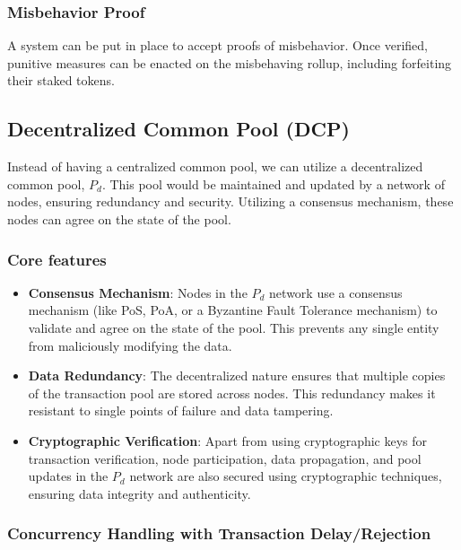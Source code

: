 \documentclass{article}
\begin{document}
\subsubsection{Misbehavior Proof}
A system can be put in place to accept proofs of misbehavior. Once verified, punitive measures can be enacted on the misbehaving rollup, including forfeiting their staked tokens.

\subsection{Decentralized Common Pool (DCP)}

Instead of having a centralized common pool, we can utilize a decentralized common pool, \( P_d \). This pool would be maintained and updated by a network of nodes, ensuring redundancy and security. Utilizing a consensus mechanism, these nodes can agree on the state of the pool.

\subsubsection{Core features}

\begin{itemize}
    \item \textbf{Consensus Mechanism}: Nodes in the \( P_d \) network use a consensus mechanism (like PoS, PoA, or a Byzantine Fault Tolerance mechanism) to validate and agree on the state of the pool. This prevents any single entity from maliciously modifying the data.
    
    \item \textbf{Data Redundancy}: The decentralized nature ensures that multiple copies of the transaction pool are stored across nodes. This redundancy makes it resistant to single points of failure and data tampering.
    
    \item \textbf{Cryptographic Verification}: Apart from using cryptographic keys for transaction verification, node participation, data propagation, and pool updates in the \( P_d \) network are also secured using cryptographic techniques, ensuring data integrity and authenticity.
\end{itemize}

\subsubsection{Concurrency Handling with Transaction Delay/Rejection}
\end{document}
